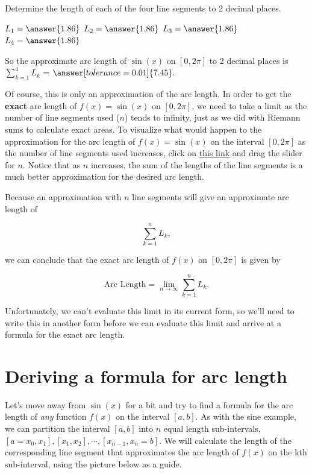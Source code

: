 \documentclass[handout,nooutcomes]{ximera}
\begin{document}

\begin{problem}
Determine the length of each of the four line segments to 2 decimal places.

$L_1 = \answer{1.86}$
$L_2 = \answer{1.86}$
$L_3 = \answer{1.86}$
$L_4 = \answer{1.86}$

So the approximate arc length of $\sin(x)$ on $[0, 2\pi]$ to 2 decimal places is $\displaystyle\sum_{k=1}^4 L_k$ = $\answer[tolerance=0.01]{7.45}.$
\end{problem}

Of course, this is only an approximation of the arc length.  In order to get the \textbf{exact} arc length of $f(x) = \sin(x)$ on $[0, 2\pi]$, we need to take a limit as the number of line segments used ($n$) tends to infinity, just as we did with Riemann sums to calculate exact areas.  To visualize what would happen to the approximation for the arc length of $f(x)=\sin(x)$ on the interval $[0,2\pi]$ as the number of line segments used increases, click on \href{https://www.desmos.com/calculator/lmz7n25cgl}{this link} and drag the slider for $n$.  Notice that as $n$ increases, the sum of the lengths of the line segments is a much better approximation for the desired arc length.  

Because an approximation with $n$ line segments will give an approximate arc length of 

$$\displaystyle\sum_{k=1}^n L_k,$$ 

we can conclude that the exact arc length of $f(x)$ on $[0, 2\pi]$ is given by 

$$\text{Arc Length} = \displaystyle\lim_{n \to \infty} \displaystyle\sum_{k=1}^n L_k.$$  

Unfortunately, we can't evaluate this limit in its current form, so we'll need to write this in another form before we can evaluate this limit and arrive at a formula for the exact arc length.  \\

\section {Deriving a formula for arc length}

Let's move away from $\sin(x)$ for a bit and try to find a formula for the arc length of \textit{any} function $f(x)$ on the interval $[a,b].$  As with the sine example, we can partition the interval $[a,b]$ into $n$ equal length sub-intervals, $[a=x_0, x_1], [x_1, x_2], \cdots , [x_{n-1}, x_n = b].$  We will calculate the length of the corresponding line segment that approximates the arc length of $f(x)$ on the kth sub-interval, using the picture below as a guide.  
\end{document}
